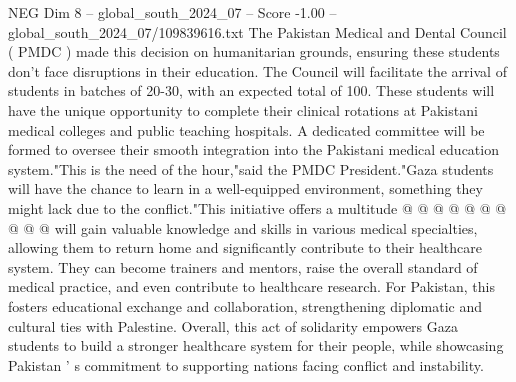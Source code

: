 \begin{textsample}{NEG Dim 8 – global\_south\_2024\_07 – Score -1.00 – global\_south\_2024\_07/109839616.txt}
The Pakistan Medical and Dental Council ( PMDC ) made this decision on humanitarian grounds, ensuring these students don't face disruptions in their education.
The Council will facilitate the arrival of students in batches of 20-30, with an expected total of 100.
These students will have the unique opportunity to complete their clinical rotations at Pakistani medical colleges and public teaching hospitals.
A dedicated committee will be formed to oversee their smooth integration into the Pakistani medical education system."This is the need of the hour,"said the PMDC President."Gaza students will have the chance to learn in a well-equipped environment, something they might lack due to the conflict."This initiative offers a multitude @ @ @ @ @ @ @ @ @ @ will gain valuable knowledge and skills in various medical specialties, allowing them to return home and significantly contribute to their healthcare system.
They can become trainers and mentors, raise the overall standard of medical practice, and even contribute to healthcare research.
For Pakistan, this fosters educational exchange and collaboration, strengthening diplomatic and cultural ties with Palestine.
Overall, this act of solidarity empowers Gaza students to build a stronger healthcare system for their people, while showcasing Pakistan ' s commitment to supporting nations facing conflict and instability.

\end{textsample}
